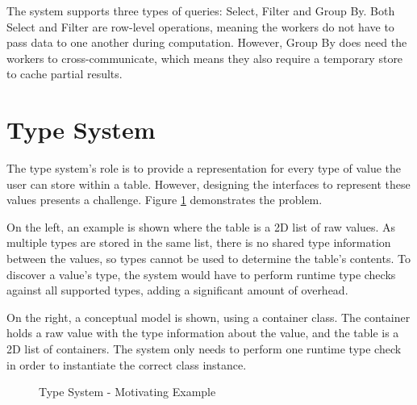 The system supports three types of queries: Select, Filter and Group By. Both Select and Filter are row-level operations, meaning the workers do not have to pass data to one another during computation. However, Group By does need the workers to cross-communicate, which means they also require a temporary store to cache partial results.

\section{Type System}\label{sec:type-system}
The type system's role is to provide a representation for every type of value the user can store within a table. However, designing the interfaces to represent these values presents a challenge. Figure \ref{fig:type-system-motivation} demonstrates the problem. 

On the left, an example is shown where the table is a 2D list of raw values. As multiple types are stored in the same list, there is no shared type information between the values, so types cannot be used to determine the table's contents. To discover a value's type, the system would have to perform runtime type checks against all supported types, adding a significant amount of overhead. 

On the right, a conceptual model is shown, using a container class. The container holds a raw value with the type information about the value, and the table is a 2D list of containers. The system only needs to perform one runtime type check in order to instantiate the correct class instance. 

\begin{figure}[htp]
	\centering
	\centering
	\qquad
	\caption{Type System - Motivating Example}
	\label{fig:type-system-motivation}
\end{figure}

